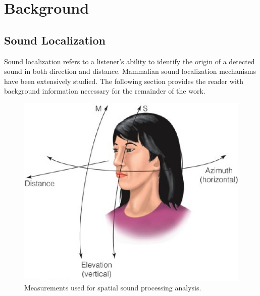 \newpage                                                   \chapter{Background}


\section{                  Sound Localization                                 }


Sound localization refers to a listener's ability to identify the origin of a
detected sound in both direction and distance. Mammalian sound localization
mechanisms have been extensively studied. The following section provides the
reader with background information necessary for the remainder of the work.

\begin{figure}[htbp]
\centering
  \begin{minipage}[b]{.6\linewidth}
    \centering
  \includegraphics[width=1\linewidth]{images/binaural_reference.jpg}
    \caption{Measurements used for spatial sound processing analysis.}
    \label{fig:binaural_measurements}
  \end{minipage}
\end{figure}


